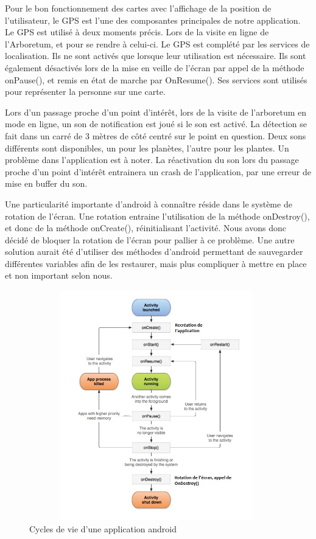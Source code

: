 \documentclass[a4paper,11pt]{article}
\begin{document}
		Pour le bon fonctionnement des cartes avec l’affichage de la position de l'utilisateur, le GPS est l'une des composantes principales de notre application. Le GPS est utilisé à deux moments précis. Lors de la visite en ligne de l'Arboretum, et pour se rendre à celui-ci. Le GPS est complété par les services de localisation. Ils ne sont activés que lorsque leur utilisation est nécessaire. Ils sont également désactivés lors de la mise en veille de l'écran par appel de la méthode onPause(), et remis en état de marche par OnResume(). Ses services sont utilisés pour représenter la personne sur une carte.
		
		Lors d'un passage proche d'un point d'intérêt, lors de la visite de l'arboretum en mode en ligne, un son de notification est joué si le son est activé. La détection se fait dans un carré de 3 mètres de côté centré sur le point en question. Deux sons différents sont disponibles, un pour les planètes, l'autre pour les plantes. Un problème dans l'application est à noter. La réactivation du son lors du passage proche d'un point d'intérêt entrainera un crash de l'application, par une erreur de mise en buffer du son.
		
		Une particularité importante d'android à connaître réside dans le système de rotation de l'écran. Une rotation entraine l'utilisation de la méthode onDestroy(), et donc de la méthode onCreate(), réinitialisant l'activité. Nous avons donc décidé de bloquer la rotation de l'écran pour pallier à ce problème. Une autre solution aurait été d'utiliser des méthodes d'android permettant de sauvegarder différentes variables afin de les restaurer, mais plus compliquer à mettre en place et non important selon nous.
		
		 \begin{figure}[H]
     \begin{center}
      \includegraphics[width=11cm,height=10cm]{cyclerotation.jpg}
      \caption{Cycles de vie d'une application android}
     \end{center}
    \end{figure}
		
\end{document}
